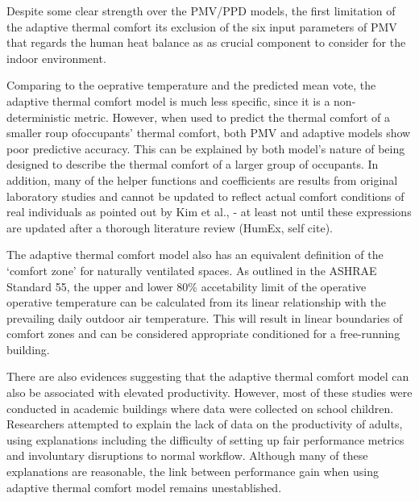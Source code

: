     Despite some clear strength over the PMV/PPD models, the first limitation of the adaptive thermal comfort its exclusion of the six input parameters of PMV that regards the human heat balance as as crucial component to consider for the indoor environment.

    Comparing to the oeprative temperature and the predicted mean vote, the adaptive thermal comfort model is much less specific, since it is a non-deterministic metric. However, when used to predict the thermal comfort of a smaller roup ofoccupants' thermal comfort, both PMV and adaptive models show poor predictive accuracy. This can be explained by both model's nature of being designed to describe the thermal comfort of a larger group of occupants\cite{van_hoof_forty_2008,auffenberg_personalised_2015}. In addition, many of the helper functions and coefficients are results from original laboratory studies and cannot be updated to reflect actual comfort conditions of real individuals as pointed out by Kim et al., \cite{kim_personal_2018} - at least not until these expressions are updated after a thorough literature review (HumEx, self cite).

    The adaptive thermal comfort model also has an equivalent definition of the `comfort zone' for naturally ventilated spaces\cite{ashrae_ansi/ashrae_2013}. As outlined in the ASHRAE Standard 55, the upper and lower 80\% accetability limit of the operative operative temperature can be calculated from its linear relationship with the prevailing daily outdoor air temperature. This will result in linear boundaries of comfort zones and can be considered appropriate conditioned for a free-running building. 

    There are also evidences suggesting that the adaptive thermal comfort model can also be associated with elevated productivity. However, most of these studies were conducted in academic buildings where data were collected on school children. Researchers attempted to explain the lack of data on the productivity of adults, using explanations including the difficulty of setting up fair performance metrics and involuntary disruptions to normal workflow. Although many of these explanations are reasonable, the link between performance gain when using adaptive thermal comfort model remains unestablished.
    
